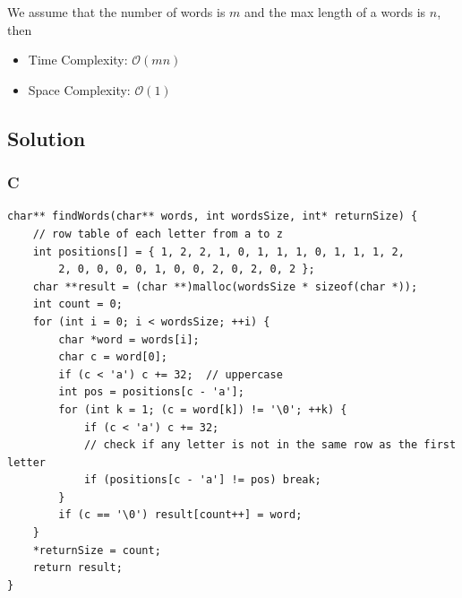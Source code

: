 We assume that the number of words is $m$ and the max length of a words is $n$, then
\begin{itemize}
    \item Time Complexity: $\mathcal{O}(mn)$
    \item Space Complexity: $\mathcal{O}(1)$
\end{itemize}

\subsection*{Solution}
\subsubsection*{C}
\begin{verbatim}
char** findWords(char** words, int wordsSize, int* returnSize) {
    // row table of each letter from a to z
    int positions[] = { 1, 2, 2, 1, 0, 1, 1, 1, 0, 1, 1, 1, 2,
        2, 0, 0, 0, 0, 1, 0, 0, 2, 0, 2, 0, 2 };
    char **result = (char **)malloc(wordsSize * sizeof(char *));
    int count = 0;
    for (int i = 0; i < wordsSize; ++i) {
        char *word = words[i];
        char c = word[0];
        if (c < 'a') c += 32;  // uppercase
        int pos = positions[c - 'a'];
        for (int k = 1; (c = word[k]) != '\0'; ++k) {
            if (c < 'a') c += 32;
            // check if any letter is not in the same row as the first letter
            if (positions[c - 'a'] != pos) break;
        }
        if (c == '\0') result[count++] = word;
    }
    *returnSize = count;
    return result;
}
\end{verbatim}

\newpage
